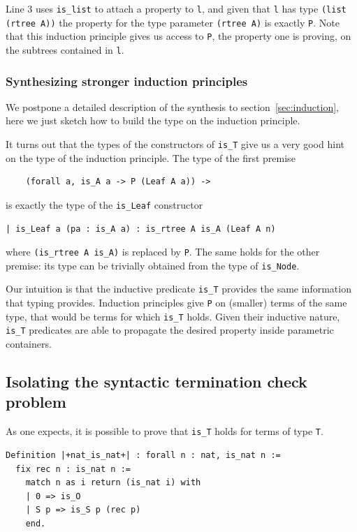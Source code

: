 \documentclass[a4paper,UKenglish,cleveref, autoref]{lipics-v2019}
\begin{document}
\noindent
Line 3 uses \lstinline+is_list+ to attach a property to \lstinline+l+,
and given that \lstinline+l+ has type \lstinline+(list (rtree A))+
the property for the type parameter \lstinline+(rtree A)+ is
exactly \lstinline+P+.
Note that this induction principle gives us access to \lstinline+P+, the
property one is proving, on the subtrees contained in \lstinline+l+.

\subsubsection{Synthesizing stronger induction principles} %

We postpone a detailed description of the synthesis to
section~\ref{sec:induction}, here we just sketch how to
build the type on the induction principle.

It turns out that the types of the constructors of
\lstinline+is_T+ give us a very good hint on the type
of the induction principle.
The type of the first premise
\begin{lstlisting}
    (forall a, is_A a -> P (Leaf A a)) ->
\end{lstlisting}

\noindent
is exactly the type of the \lstinline+is_Leaf+ constructor
\begin{lstlisting}
| is_Leaf a (pa : is_A a) : is_rtree A is_A (Leaf A n)
\end{lstlisting}

\noindent
where \lstinline+(is_rtree A is_A)+ is replaced by \lstinline+P+.
The same holds for the other premise: its type can be trivially
obtained from the type of \lstinline+is_Node+.

Our intuition is that the inductive predicate \lstinline+is_T+
provides the same information that typing provides. Induction
principles give \lstinline+P+ on (smaller) terms of the same type,
that would be terms for which \lstinline+is_T+ holds.
Given their inductive nature, \lstinline+is_T+ predicates
are able to propagate the desired property inside parametric
containers.

\subsection{Isolating the syntactic termination check problem} %
\label{sec:idea:transparent}

As one expects, it is possible to prove that \lstinline+is_T+
holds for terms of type \lstinline+T+.
\begin{lstlisting}
Definition |+nat_is_nat+| : forall n : nat, is_nat n :=
  fix rec n : is_nat n :=
    match n as i return (is_nat i) with
    | 0 => is_O
    | S p => is_S p (rec p)
    end.
\end{lstlisting}
\end{document}
